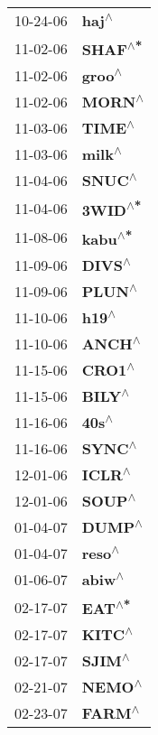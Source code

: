 \begin{supertabular}{p{0.08\textwidth}p{0.2\textwidth}}
 10-24-06 &     \textbf{haj\textsuperscript{$\wedge$}} \\
 11-02-06 &   \textbf{SHAF\textsuperscript{$\wedge$*}} \\
 11-02-06 &    \textbf{groo\textsuperscript{$\wedge$}} \\
 11-02-06 &    \textbf{MORN\textsuperscript{$\wedge$}} \\
 11-03-06 &    \textbf{TIME\textsuperscript{$\wedge$}} \\
 11-03-06 &    \textbf{milk\textsuperscript{$\wedge$}} \\
 11-04-06 &    \textbf{SNUC\textsuperscript{$\wedge$}} \\
 11-04-06 &   \textbf{3WID\textsuperscript{$\wedge$*}} \\
 11-08-06 &   \textbf{kabu\textsuperscript{$\wedge$*}} \\
 11-09-06 &    \textbf{DIVS\textsuperscript{$\wedge$}} \\
 11-09-06 &    \textbf{PLUN\textsuperscript{$\wedge$}} \\
 11-10-06 &     \textbf{h19\textsuperscript{$\wedge$}} \\
 11-10-06 &    \textbf{ANCH\textsuperscript{$\wedge$}} \\
 11-15-06 &    \textbf{CRO1\textsuperscript{$\wedge$}} \\
 11-15-06 &    \textbf{BILY\textsuperscript{$\wedge$}} \\
 11-16-06 &     \textbf{40s\textsuperscript{$\wedge$}} \\
 11-16-06 &    \textbf{SYNC\textsuperscript{$\wedge$}} \\
 12-01-06 &    \textbf{ICLR\textsuperscript{$\wedge$}} \\
 12-01-06 &    \textbf{SOUP\textsuperscript{$\wedge$}} \\
 01-04-07 &    \textbf{DUMP\textsuperscript{$\wedge$}} \\
 01-04-07 &    \textbf{reso\textsuperscript{$\wedge$}} \\
 01-06-07 &    \textbf{abiw\textsuperscript{$\wedge$}} \\
 02-17-07 &    \textbf{EAT\textsuperscript{$\wedge$*}} \\
 02-17-07 &    \textbf{KITC\textsuperscript{$\wedge$}} \\
 02-17-07 &    \textbf{SJIM\textsuperscript{$\wedge$}} \\
 02-21-07 &    \textbf{NEMO\textsuperscript{$\wedge$}} \\
 02-23-07 &    \textbf{FARM\textsuperscript{$\wedge$}} \\

\end{supertabular}
